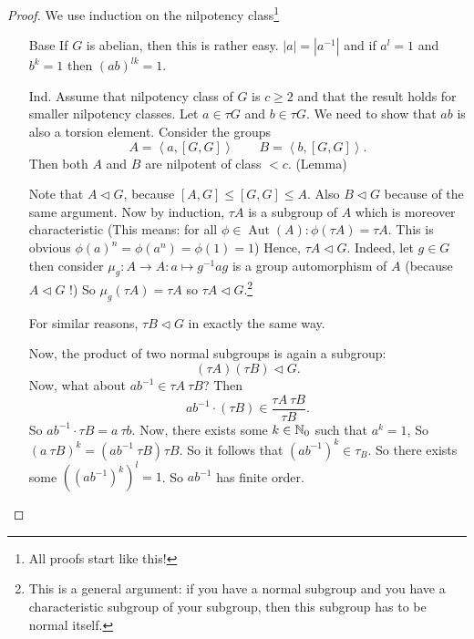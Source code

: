 \begin{proof}
    We use induction on the nilpotency class\footnote{All proofs start like this!}
    \begin{itemize}
        \item [Base]
            If $G$ is abelian, then this is rather easy. $|a| =|a^{-1}|$ and if $a^{l} = 1$ and $b^{k} = 1$ then $(ab)^{l k} = 1$.
        \item [Ind.] Assume that nilpotency class of $G $ is $c \ge 2$ and that the result holds for smaller nilpotency classes.
            Let $a \in \tau G$ and $b\in \tau G$.
            We need to show that $ab$ is also a torsion element.
            Consider the groups
            \[
                 A = \left<a, [G, G] \right> \qquad B = \left<b, [G, G] \right>
            .\] 
            Then both $A$ and  $B$ are nilpotent of class  $<c$. (Lemma)

            Note that $A \triangleleft G$, because $[A, G] \le  [G, G] \le  A$.
            Also $B \triangleleft G$ because of the same argument.
            Now by induction, $\tau A$  is a subgroup of $A$ which is moreover characteristic (This means: for all $\phi \in \operatorname{Aut}(A) : \phi( \tau A ) = \tau A$. This is obvious $\phi(a)^{n} = \phi(a^{n}) = \phi(1) = 1$)
            Hence, $\tau A \triangleleft G$. Indeed, let $g \in G$ then consider $\mu_g : A \to  A: a \mapsto g^{-1} a g$ is a group automorphism of $A$ (because $A \triangleleft G$ !)
            So $\mu_g(\tau A) = \tau A$ so  $\tau A \triangleleft G$.\footnote{This is a general argument: if you have a normal subgroup and you have a characteristic subgroup of your subgroup, then this subgroup has to be normal itself.}

            For similar reasons, $\tau B \triangleleft G$ in exactly the same way.

            Now, the product of two normal subgroups is again a subgroup:
            \[
                (\tau A )(\tau B) \triangleleft G
            .\] 
            Now, what about $a b ^{-1} \in \tau A \ \tau B$?
            Then 
            \[
                a b^{-1} \cdot (\tau B) \in \frac{\tau A \ \tau B}{\tau B}
            .\] 
            So $ab^{-1} \cdot \tau B = a \ \tau b$.
            Now, there exists some $k \in \mathbb{N}_0$ such that $a^{k}=1$,
            So  $(a \ \tau B)^{k} = (a b^{-1} \ \tau B)^{}\tau B$.
            So it follows that $(ab^{-1})^{k} \in \tau_B $.
            So there exists some $((a b^{-1})^{k})^{l} = 1$. So $ab^{-1}$ has finite order.
    \end{itemize}
\end{proof}
